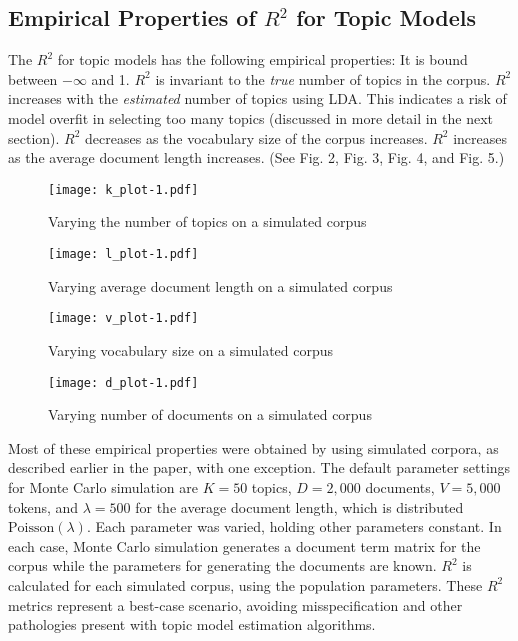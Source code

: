 \documentclass[conference,final,]{IEEEtran}
\makeatletter
\def\maxwidth{\ifdim\Gin@nat@width>\linewidth\linewidth
\else\Gin@nat@width\fi}
\let\Oldincludegraphics\includegraphics
\renewcommand{\includegraphics}[1]{\Oldincludegraphics[width=\maxwidth]{#1}}
\makeatother
\begin{document}
\hypertarget{empirical-properties-of-r2-for-topic-models}{%
\subsection{\texorpdfstring{Empirical Properties of \(R^2\) for Topic
Models}{Empirical Properties of R\^{}2 for Topic Models}}\label{empirical-properties-of-r2-for-topic-models}}

The \(R^2\) for topic models has the following empirical properties: It
is bound between \(-\infty\) and 1. \(R^2\) is invariant to the
\textit{true} number of topics in the corpus. \(R^2\) increases with the
\textit{estimated} number of topics using LDA. This indicates a risk of
model overfit in selecting too many topics (discussed in more detail in
the next section). \(R^2\) decreases as the vocabulary size of the
corpus increases. \(R^2\) increases as the average document length
increases. (See Fig. 2, Fig. 3, Fig. 4, and Fig. 5.)

\begin{figure}
\centering
\texttt{[image: k\_plot-1.pdf]}
\caption{Varying the number of topics on a simulated corpus}
\end{figure}

\begin{figure}
\centering
\texttt{[image: l\_plot-1.pdf]}
\caption{Varying average document length on a simulated corpus}
\end{figure}

\begin{figure}
\centering
\texttt{[image: v\_plot-1.pdf]}
\caption{Varying vocabulary size on a simulated corpus}
\end{figure}

\begin{figure}
\centering
\texttt{[image: d\_plot-1.pdf]}
\caption{Varying number of documents on a simulated corpus}
\end{figure}

Most of these empirical properties were obtained by using simulated
corpora, as described earlier in the paper, with one exception. The
default parameter settings for Monte Carlo simulation are \(K = 50\)
topics, \(D = 2{,}000\) documents, \(V = 5{,}000\) tokens, and
\(\lambda = 500\) for the average document length, which is distributed
\(\text{Poisson}(\lambda)\). Each parameter was varied, holding other
parameters constant. In each case, Monte Carlo simulation generates a
document term matrix for the corpus while the parameters for generating
the documents are known. \(R^2\) is calculated for each simulated
corpus, using the population parameters. These \(R^2\) metrics represent
a best-case scenario, avoiding misspecification and other pathologies
present with topic model estimation algorithms.
\end{document}
